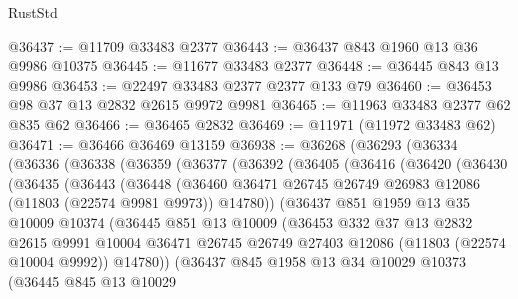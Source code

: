 \begin{lexlean}{RustStd}
\begin{coremodule}
@36437 := @11709 @33483 @2377
@36443 := @36437 @843 @1960 @13 @36 @9986 @10375
@36445 := @11677 @33483 @2377
@36448 := @36445 @843 @13 @9986
@36453 := @22497 @33483 @2377 @2377 @133 @79
@36460 := @36453 @98 @37 @13 @2832 @2615 @9972 @9981
@36465 := @11963 @33483 @2377 @62 @835 @62
@36466 := @36465 @2832
@36469 := @11971 (@11972 @33483 @62)
@36471 := @36466 @36469 @13159
@36938 := @36268
    (@36293
      (@36334
        (@36336
          (@36338
            (@36359
              (@36377
                (@36392
                  (@36405
                    (@36416
                      (@36420
                        (@36430
                          (@36435
                            (@36443
                              (@36448
                                (@36460
                                  @36471
                                  @26745
                                  @26749
                                  @26983
                                  @12086
                                  (@11803 (@22574 @9981 @9973))
                                  @14780))
                              (@36437
                                @851
                                @1959
                                @13
                                @35
                                @10009
                                @10374
                                (@36445
                                  @851
                                  @13
                                  @10009
                                  (@36453
                                    @332
                                    @37
                                    @13
                                    @2832
                                    @2615
                                    @9991
                                    @10004
                                    @36471
                                    @26745
                                    @26749
                                    @27403
                                    @12086
                                    (@11803 (@22574 @10004 @9992))
                                    @14780))
                                (@36437
                                  @845
                                  @1958
                                  @13
                                  @34
                                  @10029
                                  @10373
                                  (@36445
                                    @845
                                    @13
                                    @10029

\end{coremodule}
\end{lexlean}
